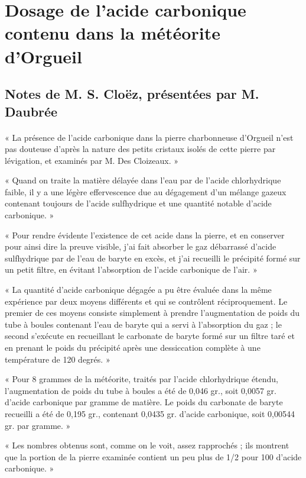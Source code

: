 \documentclass[a4paper, 11pt, oneside, polutonikogreek, french]{article}
\begin{document}
\section{Dosage de l'acide carbonique contenu dans la météorite d'Orgueil}
\subsection*{Notes de M. S. Cloëz, présentées par M. Daubrée}
\paragraph{}
« La présence de l'acide carbonique dans la pierre charbonneuse d'Orgueil n'est pas douteuse d'après la nature des petits cristaux isolés de cette pierre par lévigation, et examinés par M. Des Cloizeaux. »

« Quand on traite la matière délayée dans l'eau par de l'acide chlorhydrique faible, il y a une légère effervescence due au dégagement d'un mélange gazeux contenant toujours de l'acide sulfhydrique et une quantité notable d'acide carbonique. »

« Pour rendre évidente l'existence de cet acide dans la pierre, et en conserver pour ainsi dire la preuve visible, j'ai fait absorber le gaz débarrassé d'acide sulfhydrique par de l'eau de baryte en excès, et j'ai recueilli le précipité formé sur un petit filtre, en évitant l'absorption de l'acide carbonique de l'air. »

« La quantité d'acide carbonique dégagée a pu être évaluée dans la même expérience par deux moyens différents et qui se contrôlent réciproquement. Le premier de ces moyens consiste simplement à prendre l'augmentation de poids du tube à boules contenant l'eau de baryte qui a servi à l'absorption du gaz ; le second s'exécute en recueillant le carbonate de baryte formé sur un filtre taré et en prenant le poids du précipité après une dessiccation complète à une température de 120 degrés. »

« Pour 8 grammes de la météorite, traités par l'acide chlorhydrique étendu, l'augmentation de poids du tube à boules a été de 0,046 gr., soit 0,0057 gr. d'acide carbonique par gramme de matière. Le poids du carbonate de baryte recueilli a été de 0,195 gr., contenant 0,0435 gr. d'acide carbonique, soit 0,00544 gr. par gramme. »

« Les nombres obtenus sont, comme on le voit, assez rapprochés ; ils montrent que la portion de la pierre examinée contient un peu plus de 1/2 pour 100 d'acide carbonique. »
\clearpage
\end{document}
